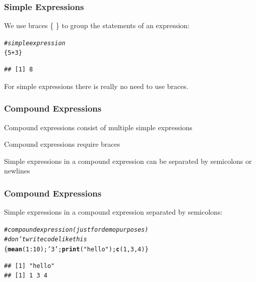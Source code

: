 \documentclass[12pt]{beamer}\usepackage[]{graphicx}\usepackage[]{color}
\makeatletter
\newcommand{\hlnum}[1]{\textcolor[rgb]{0.686,0.059,0.569}{#1}}%
\newcommand{\hlstr}[1]{\textcolor[rgb]{0.192,0.494,0.8}{#1}}%
\newcommand{\hlcom}[1]{\textcolor[rgb]{0.678,0.584,0.686}{\textit{#1}}}%
\newcommand{\hlopt}[1]{\textcolor[rgb]{0,0,0}{#1}}%
\newcommand{\hlstd}[1]{\textcolor[rgb]{0.345,0.345,0.345}{#1}}%
\newcommand{\hlkwd}[1]{\textcolor[rgb]{0.737,0.353,0.396}{\textbf{#1}}}%
\newenvironment{kframe}{%
 \def\at@end@of@kframe{}%
 \ifinner\ifhmode%
  \def\at@end@of@kframe{\end{minipage}}%
  \begin{minipage}{\columnwidth}%
 \fi\fi%
 \def\FrameCommand##1{\hskip\@totalleftmargin \hskip-\fboxsep
 \colorbox{shadecolor}{##1}\hskip-\fboxsep
     \hskip-\linewidth \hskip-\@totalleftmargin \hskip\columnwidth}%
 \MakeFramed {\advance\hsize-\width
   \@totalleftmargin\z@ \linewidth\hsize
   \@setminipage}}%
 {\par\unskip\endMakeFramed%
 \at@end@of@kframe}
\newenvironment{knitrout}{}{} %
\makeatother
\begin{document}

\begin{frame}[fragile]
\frametitle{Simple Expressions}

We use braces \{ \} to group the statements of an expression:
\begin{knitrout}\footnotesize
{}\color{fgcolor}\begin{kframe}
\begin{alltt}
\hlcom{# simple expression}
\hlstd{\{}\hlnum{5} \hlopt{+} \hlnum{3}\hlstd{\}}
\end{alltt}
\begin{verbatim}
## [1] 8
\end{verbatim}
\end{kframe}
\end{knitrout}
For simple expressions there is really no need to use braces.

\end{frame}


\begin{frame}[fragile]
\frametitle{Compound Expressions}

\bbi
  \item Compound expressions consist of multiple simple expressions
  \item Compound expressions require braces
  \item Simple expressions in a compound expression can be separated by semicolons or newlines
\ei

\end{frame}


\begin{frame}[fragile]
\frametitle{Compound Expressions}

Simple expressions in a compound expression separated by semicolons:
\begin{knitrout}\footnotesize
{}\color{fgcolor}\begin{kframe}
\begin{alltt}
\hlcom{# compound expression (just for demo purposes)}
\hlcom{# don't write code like this}
\hlstd{\{}\hlkwd{mean}\hlstd{(}\hlnum{1}\hlopt{:}\hlnum{10}\hlstd{);} \hlstr{'3'}\hlstd{;} \hlkwd{print}\hlstd{(}\hlstr{"hello"}\hlstd{);} \hlkwd{c}\hlstd{(}\hlnum{1}\hlstd{,} \hlnum{3}\hlstd{,} \hlnum{4}\hlstd{)\}}
\end{alltt}
\begin{verbatim}
## [1] "hello"
## [1] 1 3 4
\end{verbatim}
\end{kframe}
\end{knitrout}

\end{frame}
\end{document}
